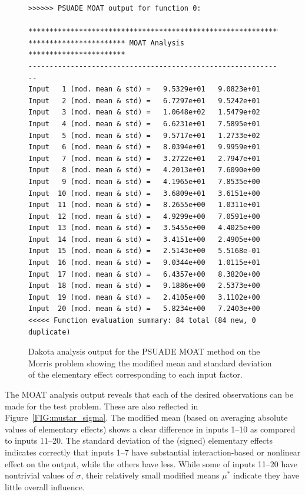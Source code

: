 \begin{figure}[ht!]
\centering
\begin{bigbox}
\begin{small}
\begin{verbatim}
>>>>>> PSUADE MOAT output for function 0:

*************************************************************
*********************** MOAT Analysis ***********************
-------------------------------------------------------------
Input   1 (mod. mean & std) =   9.5329e+01   9.0823e+01 
Input   2 (mod. mean & std) =   6.7297e+01   9.5242e+01 
Input   3 (mod. mean & std) =   1.0648e+02   1.5479e+02 
Input   4 (mod. mean & std) =   6.6231e+01   7.5895e+01 
Input   5 (mod. mean & std) =   9.5717e+01   1.2733e+02 
Input   6 (mod. mean & std) =   8.0394e+01   9.9959e+01 
Input   7 (mod. mean & std) =   3.2722e+01   2.7947e+01 
Input   8 (mod. mean & std) =   4.2013e+01   7.6090e+00 
Input   9 (mod. mean & std) =   4.1965e+01   7.8535e+00 
Input  10 (mod. mean & std) =   3.6809e+01   3.6151e+00 
Input  11 (mod. mean & std) =   8.2655e+00   1.0311e+01 
Input  12 (mod. mean & std) =   4.9299e+00   7.0591e+00 
Input  13 (mod. mean & std) =   3.5455e+00   4.4025e+00 
Input  14 (mod. mean & std) =   3.4151e+00   2.4905e+00 
Input  15 (mod. mean & std) =   2.5143e+00   5.5168e-01 
Input  16 (mod. mean & std) =   9.0344e+00   1.0115e+01 
Input  17 (mod. mean & std) =   6.4357e+00   8.3820e+00 
Input  18 (mod. mean & std) =   9.1886e+00   2.5373e+00 
Input  19 (mod. mean & std) =   2.4105e+00   3.1102e+00 
Input  20 (mod. mean & std) =   5.8234e+00   7.2403e+00 
<<<<< Function evaluation summary: 84 total (84 new, 0 duplicate)
\end{verbatim}
\end{small}
\end{bigbox}
\caption[Dakota analysis output for PSUADE
MOAT.]{\label{FIG:moat:out_results} Dakota analysis output for the
PSUADE MOAT method on the Morris problem showing the modified
mean and standard deviation of the elementary effect corresponding to
each input factor.}
\end{figure}
The MOAT analysis output reveals that each of the desired observations
can be made for the test problem. These are also reflected in
Figure~\ref{FIG:mustar_sigma}. The modified mean (based on averaging
absolute values of elementary effects) shows a clear difference in
inputs 1--10 as compared to inputs 11--20. The standard deviation of
the (signed) elementary effects indicates correctly that inputs 1--7
have substantial interaction-based or nonlinear effect on the output,
while the others have less. While some of inputs 11--20 have
nontrivial values of $\sigma$, their relatively small modified means
$\mu^*$ indicate they have little overall influence.

